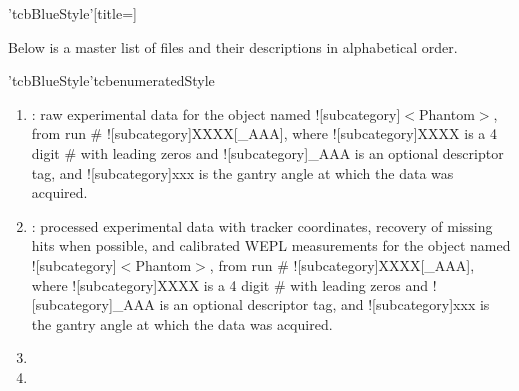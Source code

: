 \begin{tcbenvironment}'tcbBlueStyle'[title=]
\begin{tcbContentsBox}
 Below is a master list of files and their descriptions in alphabetical order.
\end{tcbContentsBox}
\begin{tcbparagraph}'tcbBlueStyle'{tcbenumeratedStyle}
\begin{enumerate}
	\item {} : raw experimental data for the object named \docentry![subcategory]{$<$Phantom$>$}, from run \# \docentry![subcategory]{XXXX[\_AAA]}, where \docentry![subcategory]{XXXX} is a 4 digit \# with leading zeros and \docentry![subcategory]{\_AAA} is an optional descriptor tag, and \docentry![subcategory]{xxx} is the gantry angle at which the data was acquired.
	\item {} : processed experimental data with tracker coordinates, recovery of missing hits when possible, and calibrated WEPL measurements for the object named \docentry![subcategory]{$<$Phantom$>$}, from run \# \docentry![subcategory]{XXXX[\_AAA]}, where \docentry![subcategory]{XXXX} is a 4 digit \# with leading zeros and \docentry![subcategory]{\_AAA} is an optional descriptor tag, and \docentry![subcategory]{xxx} is the gantry angle at which the data was acquired.
	\item {}
	\item {}

\end{enumerate}
\end{tcbparagraph}
\end{tcbenvironment}
